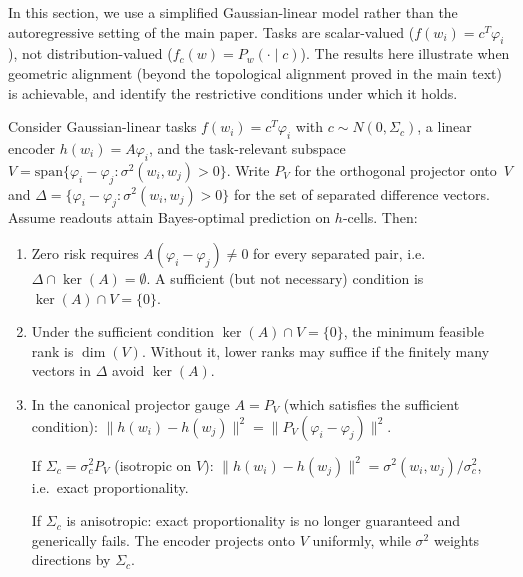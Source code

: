 \documentclass[twoside,11pt]{article}
\newcommand{\sigmasq}{\sigma^2}
\begin{document}
\begin{remark}
In this section, we use a simplified Gaussian-linear model rather than the autoregressive setting of the main paper. Tasks are scalar-valued ($f(w_i) = c^T \varphi_i$), not distribution-valued ($f_c(w) = P_w(\cdot\mid c)$). The results here illustrate when geometric alignment (beyond the topological alignment proved in the main text) is achievable, and identify the restrictive conditions under which it holds.
\end{remark}

\begin{theorem}\label{thm:geometry-gaussian}
Consider Gaussian-linear tasks $f(w_i) = c^T \varphi_i$ with $c \sim N(0, \Sigma_c)$, a linear encoder $h(w_i) = A\varphi_i$, and the task-relevant subspace
$V = \mathrm{span}\{\varphi_i - \varphi_j : \sigmasq(w_i,w_j)>0\}$.
Write $P_V$ for the orthogonal projector onto~$V$ and $\Delta = \{\varphi_i - \varphi_j : \sigmasq(w_i,w_j) > 0\}$ for the set of separated difference vectors. Assume readouts attain Bayes-optimal prediction on $h$-cells. Then:
\begin{enumerate}[label=(\alph*)]
\item Zero risk requires $A(\varphi_i - \varphi_j) \neq 0$ for every separated pair, i.e.\ $\Delta \cap \ker(A) = \emptyset$. A sufficient (but not necessary) condition is $\ker(A) \cap V = \{0\}$.

\item Under the sufficient condition $\ker(A) \cap V = \{0\}$, the minimum feasible rank is $\dim(V)$. Without it, lower ranks may suffice if the finitely many vectors in $\Delta$ avoid $\ker(A)$.

\item In the canonical projector gauge $A = P_V$ (which satisfies the sufficient condition):
$\|h(w_i) - h(w_j)\|^2 = \|P_V(\varphi_i - \varphi_j)\|^2$.

If $\Sigma_c = \sigma_c^2 P_V$ (isotropic on $V$):
$\|h(w_i) - h(w_j)\|^2 = \sigmasq(w_i, w_j) / \sigma_c^2$, i.e.\ exact proportionality.

If $\Sigma_c$ is anisotropic: exact proportionality is no longer guaranteed and generically fails. The encoder projects onto $V$ uniformly, while $\sigmasq$ weights directions by $\Sigma_c$.
\end{enumerate}
\end{theorem}
\end{document}
